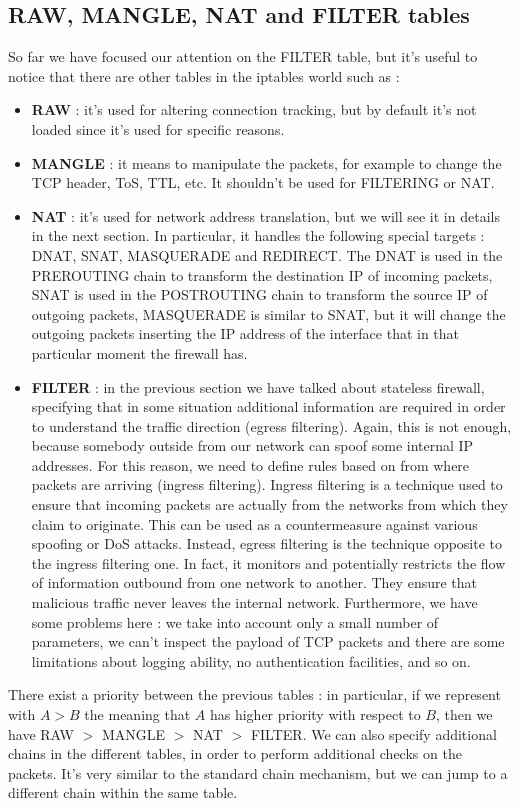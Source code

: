 \documentclass[11pt]{article}
\begin{document}
\subsection{RAW, MANGLE, NAT and FILTER tables}
So far we have focused our attention on the FILTER table, but it's useful to notice that there are other tables in the iptables world such as :
\begin{itemize}
\item \textbf{RAW} : it's used for altering connection tracking, but by default it's not loaded since it's used for specific reasons.
\item \textbf{MANGLE} : it means to manipulate the packets, for example to change the TCP header, ToS, TTL, etc. It shouldn't be used for FILTERING or NAT.
\item \textbf{NAT} : it's used for network address translation, but we will see it in details in the next section. In particular, it handles the following special targets : DNAT, SNAT, MASQUERADE and REDIRECT. The DNAT is used in the PREROUTING chain to transform the destination IP of incoming packets, SNAT is used in the POSTROUTING chain to transform the source IP of outgoing packets, MASQUERADE is similar to SNAT, but it will change the outgoing packets inserting the IP address of the interface that in that particular moment the firewall has.
\item \textbf{FILTER} : in the previous section we have talked about stateless firewall, specifying that in some situation additional information are required in order to understand the traffic direction (egress filtering). Again, this is not enough, because somebody outside from our network can spoof some internal IP addresses. For this reason, we need to define rules based on from where packets are arriving (ingress filtering). Ingress filtering is a technique used to ensure that incoming packets are actually from the networks from which they claim to originate. This can be used as a countermeasure against various spoofing or DoS attacks. Instead, egress filtering is the technique opposite to the ingress filtering one. In fact, it monitors and potentially restricts the flow of information outbound from one network to another. They ensure that malicious traffic never leaves the internal network. Furthermore, we have some problems here :  we take into account only a small number of parameters, we can't inspect the payload of TCP packets and there are some limitations about logging ability, no authentication facilities, and so on.
\end{itemize}
There exist a priority between the previous tables : in particular, if we represent with $A > B$ the meaning that $A$ has higher priority with respect to $B$, then we have RAW $>$ MANGLE $>$ NAT $>$ FILTER. We can also specify additional chains in the different tables, in order to perform additional checks on the packets. It's very similar to the standard chain mechanism, but we can jump to a different chain within the same table.
\end{document}
